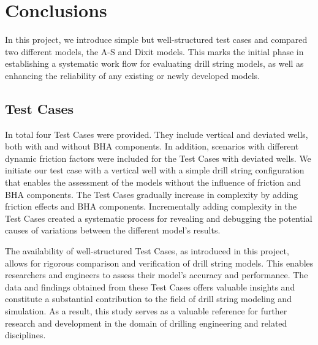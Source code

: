 \section{Conclusions}
In this project, we introduce simple but well-structured test cases and compared two different models, the A-S and Dixit models. This marks the initial phase in establishing a systematic work flow for evaluating drill string models, as well as enhancing the reliability of any existing or newly developed models.

\subsection{Test Cases}
In total four Test Cases were provided. They include vertical and deviated wells, both with and without BHA components. In addition, scenarios with different dynamic friction factors were included for the Test Cases with deviated wells. We initiate our test case with a vertical well with a simple drill string configuration that enables the assessment of the models without the influence of friction and BHA components. The Test Cases gradually increase in complexity by adding friction effects and BHA components. Incrementally adding complexity in the Test Cases created a systematic process for revealing and debugging the potential causes of variations between the different model's results.

The availability of well-structured Test Cases, as introduced in this project, allows for rigorous comparison and verification of drill string models. This enables researchers and engineers to assess their model's accuracy and performance. The data and findings obtained from these Test Cases offers valuable insights and constitute a substantial contribution to the field of drill string modeling and simulation. As a result, this study serves as a valuable reference for further research and development in the domain of drilling engineering and related disciplines.

